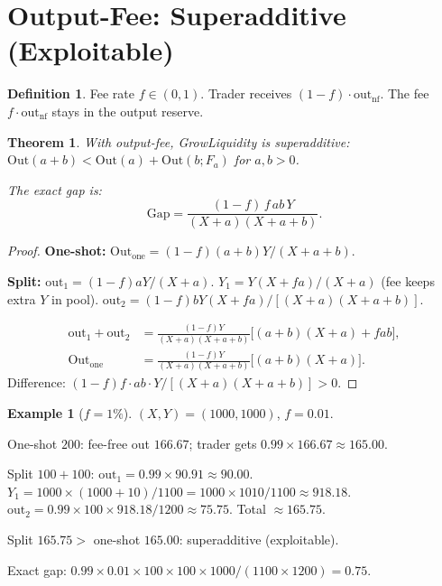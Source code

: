 \documentclass[11pt]{article}
\newtheorem{theorem}{Theorem}
\theoremstyle{definition}
\newtheorem{definition}{Definition}
\newtheorem{example}{Example}
\newcommand{\Out}{\mathrm{Out}}
\begin{document}
\section{Output-Fee: Superadditive (Exploitable)}\label{sec:output-fee}

\begin{definition}\label{def:output-fee}
Fee rate $f \in (0,1)$.  Trader receives $(1-f) \cdot \mathrm{out}_{\mathrm{nf}}$.
The fee $f \cdot \mathrm{out}_{\mathrm{nf}}$ stays in the output reserve.
\end{definition}

\begin{theorem}\label{thm:super}
With output-fee, GrowLiquidity is superadditive:
$\Out(a+b) < \Out(a) + \Out(b; F_a)$ for $a,b > 0$.

The exact gap is:
\begin{equation}\label{eq:super-gap}
\boxed{\mathrm{Gap} = \frac{(1-f)\,f\,ab\,Y}{(X+a)(X+a+b)}.}
\end{equation}
\end{theorem}

\begin{proof}
\textbf{One-shot:}
$\Out_{\text{one}} = (1-f)(a+b)Y / (X+a+b)$.

\textbf{Split:}
$\mathrm{out}_1 = (1-f)aY/(X+a)$.
$Y_1 = Y(X+fa)/(X+a)$ (fee keeps extra $Y$ in pool).
$\mathrm{out}_2 = (1-f)bY(X+fa)/[(X+a)(X+a+b)]$.

\begin{align*}
\mathrm{out}_1 + \mathrm{out}_2
&= \frac{(1-f)Y}{(X+a)(X+a+b)}\bigl[(a+b)(X+a) + fab\bigr],\\[4pt]
\Out_{\text{one}}
&= \frac{(1-f)Y}{(X+a)(X+a+b)}\bigl[(a+b)(X+a)\bigr].
\end{align*}
Difference: $(1-f)f \cdot ab \cdot Y / [(X+a)(X+a+b)] > 0$.
\end{proof}

\begin{example}[$f = 1\%$]\label{ex:super-num}
$(X,Y) = (1000, 1000)$, $f = 0.01$.

One-shot $200$: fee-free out $166.67$; trader gets $0.99 \times 166.67 \approx 165.00$.

Split $100 + 100$:
$\mathrm{out}_1 = 0.99 \times 90.91 \approx 90.00$.
$Y_1 = 1000 \times (1000 + 10)/1100 = 1000 \times 1010/1100 \approx 918.18$.
$\mathrm{out}_2 = 0.99 \times 100 \times 918.18/1200 \approx 75.75$.
Total $\approx 165.75$.

Split $165.75 >$ one-shot $165.00$: superadditive (exploitable). \checkmark

Exact gap: $0.99 \times 0.01 \times 100 \times 100 \times 1000 / (1100 \times 1200) = 0.75$.
\end{example}
\end{document}
